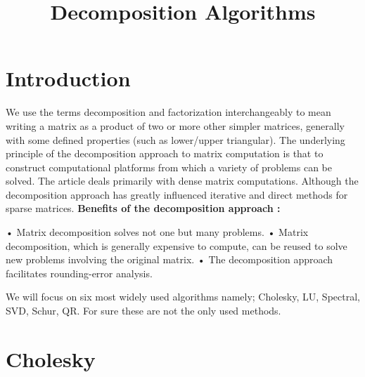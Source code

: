\documentclass[]{finalproject}
\title{Decomposition Algorithms}
\begin{document}
\maketitle

\section{Introduction} \label{introduction}

\begin{flushleft}

We use the terms decomposition and factorization interchangeably to mean writing a matrix as a product of two or more other simpler matrices, generally with some defined properties (such as lower/upper triangular). \newline
The underlying principle of the decomposition approach to matrix computation is that to construct computational platforms from which a variety of problems can be solved.
The article deals primarily with dense matrix computations. Although the decomposition approach has greatly influenced iterative and direct methods for sparse matrices. \newline \newline
\textbf{Benefits of the decomposition approach :} 
\begin{flushleft}
• Matrix decomposition solves not one but many problems. \newline
• Matrix decomposition, which is generally expensive to compute, can be reused to solve new problems involving the original matrix.\newline
• The decomposition approach facilitates rounding-error analysis.\newline
\end{flushleft}
We will focus on six most widely used  algorithms namely; Cholesky, LU, Spectral, SVD, Schur, QR. For sure these are not the only used methods.
\newline
\end{flushleft}

\section{Cholesky} \label{cholesky}
\end{document}
